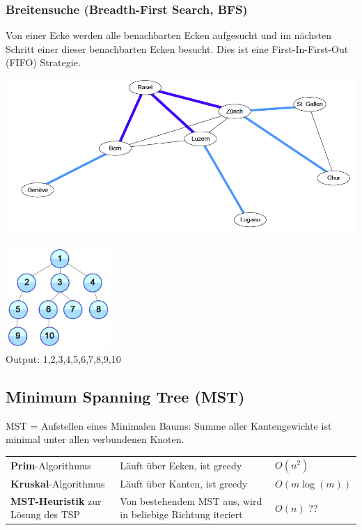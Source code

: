 \begin{minipage}{0.5\textwidth}
	\subsubsection{Breitensuche (Breadth-First Search, BFS)}
	  	Von einer Ecke werden alle benachbarten Ecken aufgesucht und im nächsten Schritt einer dieser benachbarten Ecken besucht. Dies ist eine First-In-First-Out (FIFO) Strategie.
	  	
	  	\includegraphics[width=\textwidth]{Content/Graphen/BFS.png}  
	  	\begin{center}
	  	\includegraphics[width=0.3\textwidth]{Content/Graphen/breitensuche.png}\\
	  	Output: 1,2,3,4,5,6,7,8,9,10
	  	\end{center}
\end{minipage}

	
\subsection{Minimum Spanning Tree (MST)}

MST = Aufstellen eines Minimalen Baums: Summe aller Kantengewichte ist minimal unter allen verbundenen Knoten.
	
	\begin{tabularx}{\textwidth}{p{4cm} X p{4cm}}
	  \textbf{Prim}-Algorithmus
	    & Läuft über Ecken, ist greedy
	    & $O(n^2)$ \\
	  \textbf{Kruskal}-Algorithmus
	    & Läuft über Kanten, ist greedy
	    & $O(m \log(m))$\\
	  \textbf{MST-Heuristik} zur Lö\-sung des TSP
	    & Von bestehendem MST aus, wird in beliebige Richtung iteriert
	    & $O(n)$ ??
	\end{tabularx}


